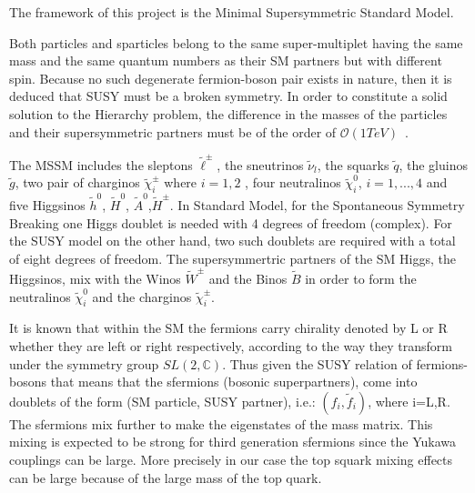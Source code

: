 \documentclass[12pt,a4paper]{report}
\begin{document}
The framework of this project is the Minimal Supersymmetric Standard Model. 

Both particles and sparticles belong to the same super-multiplet having the same mass and the same quantum 
numbers as their SM partners but with different spin. Because no such degenerate fermion-boson pair exists 
in nature,
then it is deduced that SUSY must be a broken symmetry. In order to constitute a solid solution to the 
Hierarchy problem, the difference in the masses of the particles and their supersymmetric partners 
must be of the order of $\mathcal{O}(1  TeV) $~\cite{nagashima2014beyond}.


The MSSM includes the sleptons $\tilde{\ell}^{\pm}$, the sneutrinos $\tilde{\nu}_{l}$, the squarks $\tilde{q}$, the 
gluinos $\tilde{g}$, two pair of charginos $\tilde{\chi}^{\pm}_{i}$ where $i=1,2$ ,  four neutralinos 
$\tilde{\chi}^{0}_{i}$, $i=1,...,4$ and five Higgsinos $\tilde{h}^{0}$, $\tilde{H}^{0}$,
$\tilde{A}^{0}$,$\tilde{H}^{\pm}$.
In Standard Model, for the Spontaneous Symmetry Breaking one Higgs doublet is needed with 4 degrees of 
freedom (complex). For the SUSY model on the other hand, two such doublets are required with a total of eight 
degrees of freedom. The supersymmertric partners of the SM Higgs, the Higgsinos, mix with the Winos 
$\tilde{W}^{\pm}$ and the 
Binos $\tilde{B}$ in order to form the neutralinos $\tilde{\chi}_{i}^{0}$ and the charginos 
$\tilde{\chi}_{i}^{\pm}$.  



It is known that within the SM the fermions carry chirality denoted by L or R whether they are left or right 
respectively, according to the way they transform under the symmetry group $SL(2,\mathbb{C})$. Thus given 
the SUSY relation of fermions-bosons that means that the sfermions  (bosonic superpartners), come into 
doublets of the form (SM particle, SUSY partner), i.e.: $(f_{i},\tilde{f}_{i})$, where i=L,R. 
The sfermions mix further to make the eigenstates
of the mass matrix. This mixing is expected to be strong for third generation sfermions since the Yukawa 
couplings can be large. More precisely in our case the top squark mixing effects can be large because
of the large mass of the top quark.
\end{document}
